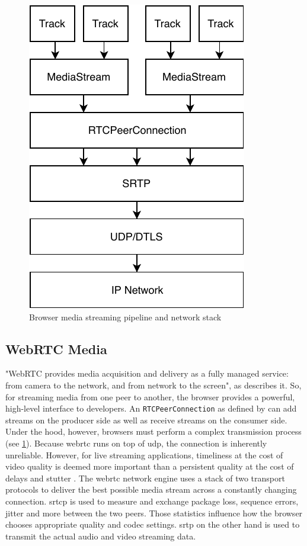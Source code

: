 \begin{figure}
\centering
\includegraphics[width=.5\textwidth]{graphics/media-stream-pipeline.pdf}
\caption{Browser media streaming pipeline and network stack}
\label{fig:pipeline}
\end{figure}

\subsection{WebRTC Media}
\label{subsec:webrtc-media}

"WebRTC provides media acquisition and delivery as a fully managed service: from camera to the network, and from network to the screen", as \citet[\S18.5]{high-performance-browser-networking} describes it. So, for streaming media from one peer to another, the browser provides a powerful, high-level interface to developers. An \lstinline|RTCPeerConnection| as defined by \cite[\S4.4]{webrtc-w3c} can add streams on the producer side as well as receive streams on the consumer side. Under the hood, however, browsers must perform a complex transmission process (see \cref{fig:pipeline}). Because \gls{webrtc} runs on top of \gls{udp}, the connection is inherently unreliable. However, for live streaming applications, timeliness at the cost of video quality is deemed more important than a persistent quality at the cost of delays and stutter \cite[\S18.3]{high-performance-browser-networking}. The \gls{webrtc} network engine uses a stack of two transport protocols to deliver the best possible media stream across a constantly changing connection. \Gls{srtcp} is used to measure and exchange package loss, sequence errors, jitter and more between the two peers. Those statistics influence how the browser chooses appropriate quality and codec settings. \gls{srtp} on the other hand is used to transmit the actual audio and video streaming data.

